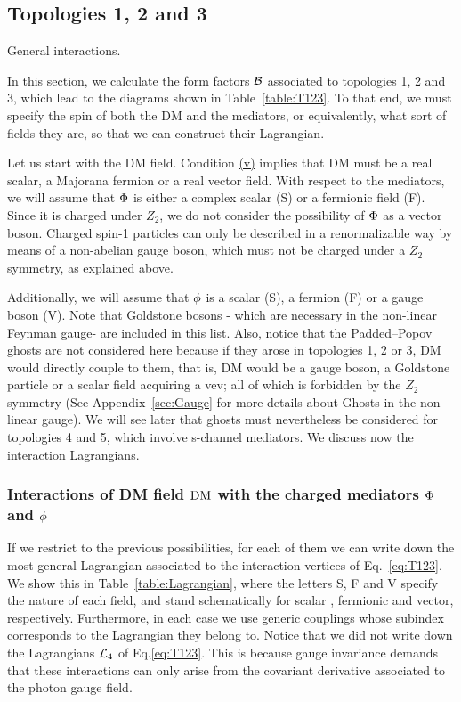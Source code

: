 \subsection{Topologies 1, 2 and 3}
\label{sec:T123}

\begin{table}[H]
\usebox{\Lagrangian}
\caption{General interactions.}
\label{table:Lagrangian}
\end{table}

In this section, we calculate the form factors ${\cal B}$ associated to topologies 1, 2 and 3, which lead to the diagrams shown in Table~\ref{table:T123}. To that end, we must specify the spin of both the DM and the mediators, or equivalently, what sort of fields they are, so that we can construct their Lagrangian. %


Let us start with the DM field.  Condition \hyperref[condition:v]{(v)} implies that DM must be a real scalar, a Majorana fermion or a real vector field. 
With respect to the mediators, we will assume that ${\Phi}$ is either a complex scalar (S) or a fermionic field (F). Since it is charged under $Z_2$,  we do not consider the possibility of ${\Phi}$ as a vector boson. Charged spin-1 particles can only be described in a renormalizable way by means of a non-abelian gauge boson, which must not be charged under a $Z_2$ symmetry, as explained above. 

Additionally, we will assume that ${\phi}$ is a scalar (S), a fermion (F) or a gauge boson (V). Note that Goldstone bosons - which are necessary in the non-linear Feynman gauge- are included in this list. Also, notice that the Padded--Popov ghosts are not considered here because  if they  arose in topologies 1, 2 or 3, DM would directly couple to them, that is, DM would be a gauge boson, a Goldstone particle or a scalar field acquiring a vev; all of which is forbidden by the $Z_2$ symmetry (See Appendix~\ref{sec:Gauge} for more details about  Ghosts in the non-linear gauge). We will see later that ghosts must nevertheless be considered for topologies 4 and 5, which involve s-channel mediators.  We discuss now the interaction Lagrangians.

\subsubsection{Interactions of DM field $\text{DM}$ with  the charged mediators ${\Phi}$ and ${\phi}$} 
If we restrict to the previous possibilities, for each of them we can write down the most general Lagrangian associated to the interaction vertices of  Eq.~\eqref{eq:T123}. We show this in Table~\ref{table:Lagrangian}, where the letters S, F and V specify the nature of each field, and stand schematically for scalar , fermionic and vector, respectively. Furthermore, in each case we use generic couplings whose subindex corresponds to the Lagrangian they belong to. Notice that we did not write down the Lagrangians ${\cal L}_4$ of Eq.\eqref{eq:T123}.
This is because gauge invariance demands that these interactions can only arise from the covariant derivative associated to the photon gauge field. 

